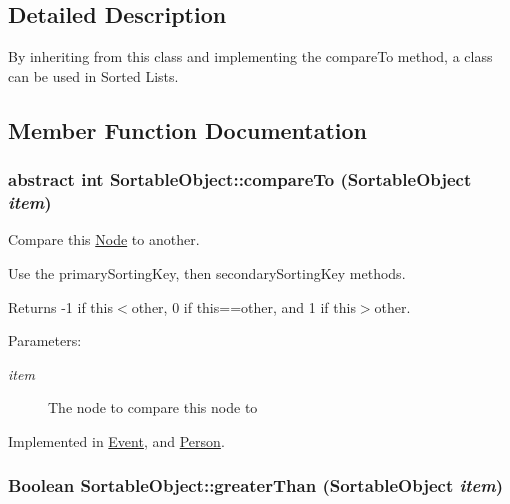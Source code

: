 \subsection{Detailed Description}
By inheriting from this class and implementing the compareTo method, a class can be used in Sorted Lists. 

\subsection{Member Function Documentation}
\hypertarget{class_sortable_object_b8f80361da32c8b04d89116993e60847}{
\subsubsection[{compareTo}]{\setlength{\rightskip}{0pt plus 5cm}abstract int SortableObject::compareTo ({\bf SortableObject} {\em item})}}
\label{class_sortable_object_b8f80361da32c8b04d89116993e60847}


Compare this \hyperlink{class_node}{Node} to another. 

Use the primarySortingKey, then secondarySortingKey methods.

Returns -1 if this$<$other, 0 if this==other, and 1 if this$>$other.

\begin{Desc}
\item[Parameters:]
\begin{description}
\item[{\em item}]The node to compare this node to \end{description}
\end{Desc}


Implemented in \hyperlink{class_event_6ef202b20715ab70bcfc052e64f1094b}{Event}, and \hyperlink{class_person_7cf242bfd4f0bfac0d7baec9dc420c7d}{Person}.\hypertarget{class_sortable_object_b450b5c6e59922086c2b50e033a1d022}{
\subsubsection[{greaterThan}]{\setlength{\rightskip}{0pt plus 5cm}Boolean SortableObject::greaterThan ({\bf SortableObject} {\em item})}}
\label{class_sortable_object_b450b5c6e59922086c2b50e033a1d022}


